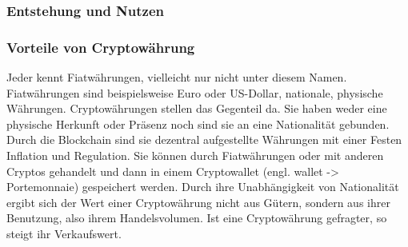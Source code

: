 \documentclass[12pt]{article}
\begin{document}
	\subsubsection{Entstehung und Nutzen}
	\subsubsection{Vorteile von Cryptowährung}
		Jeder kennt Fiatwährungen, vielleicht nur nicht unter diesem Namen. Fiatwährungen sind beispielsweise Euro oder US-Dollar, nationale, physische Währungen. Cryptowährungen stellen das Gegenteil da. Sie haben weder eine physische Herkunft oder Präsenz noch sind sie an eine Nationalität gebunden. Durch die Blockchain sind sie dezentral aufgestellte Währungen mit einer Festen Inflation und Regulation. Sie können durch Fiatwährungen oder mit anderen Cryptos gehandelt und dann in einem Cryptowallet (engl. wallet -> Portemonnaie) gespeichert werden. Durch ihre Unabhängigkeit von Nationalität ergibt sich der Wert einer Cryptowährung nicht aus Gütern, sondern aus ihrer Benutzung, also ihrem Handelsvolumen. Ist eine Cryptowährung gefragter, so steigt ihr Verkaufswert.
\end{document}
